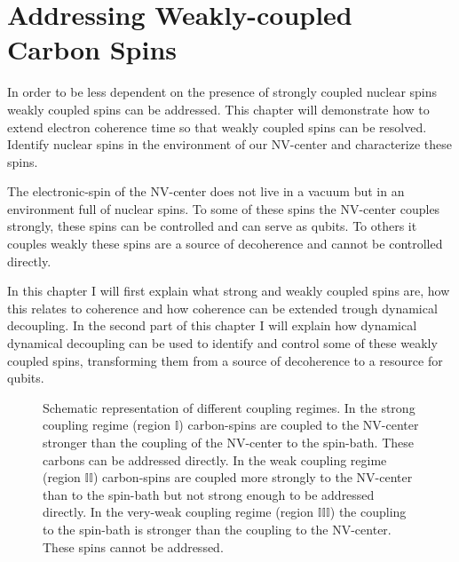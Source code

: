 
\chapter{Addressing Weakly-coupled Carbon Spins}

In order to be less dependent on the presence of strongly coupled nuclear spins weakly coupled spins can be addressed.
This chapter will demonstrate how to extend electron coherence time so that weakly coupled spins can be resolved.
Identify nuclear spins in the environment of our NV-center and characterize these spins.







The electronic-spin of the NV-center does not live in a vacuum but in an environment full of nuclear spins.
To some of these spins the NV-center couples strongly, these spins can be controlled and can serve as qubits.
To others it couples weakly these spins are a source of decoherence and cannot be controlled directly.

In this chapter I will first explain what strong and weakly coupled spins are, how this relates to coherence and how coherence can be extended trough dynamical decoupling.
In the second part of this chapter I will explain how dynamical dynamical decoupling can be used to identify and control some of these weakly coupled spins, transforming them from a source of decoherence to a resource for qubits.

\begin{figure}[htbp]
\centering
    \caption{ Schematic representation of different coupling regimes. In the strong coupling regime (region $\mathbb{I}$) carbon-spins are coupled to the NV-center stronger than the coupling of the NV-center to the spin-bath. These carbons can be addressed directly. In the weak coupling regime (region $\mathbb{II}$) carbon-spins are coupled more strongly to the NV-center than to the spin-bath but not strong enough to be addressed directly. In the very-weak coupling regime (region $\mathbb{III}$) the coupling to the spin-bath is stronger than the coupling to the NV-center. These spins cannot be addressed.}
    \label{fig:coupling regimes}
\end{figure}
